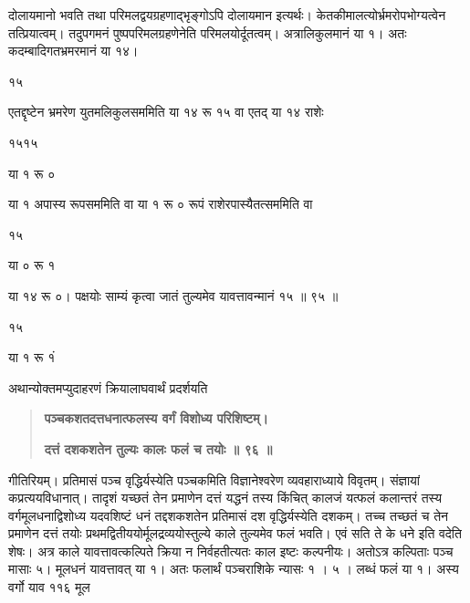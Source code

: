 \documentclass[11pt, openany]{book}
\begin{document}
\begin{sloppypar}
\hangindent=0.2in दोलायमानो भवति तथा परिमलद्वयग्रहणाद्भृङ्गोऽपि दोलायमान इत्यर्थः। केतकीमालत्योर्भ्रमरोपभोग्यत्वेन तत्प्रियात्वम्। तदुपगमनं पुष्पपरिमलग्रहणेनेति परिमलयोर्दूतत्वम्। अत्रालिकुलमानं या १। अतः कदम्बादिगतभ्रमरमानं या १४।

\hspace{2.15in}१५

\hangindent=0.2in एतद्दृष्टेन भ्रमरेण युतमलिकुलसममिति या १४ रू १५ वा एतद् या १४ राशेः

\hspace{2.55in}१५\hspace{1.3in}१५

\hspace{2.35in}या\hspace{0.1in} १ रू ०

\hangindent=0.2in या १ अपास्य रूपसममिति वा या १ रू ० रूपं राशेरपास्यैतत्सममिति वा

\hspace{2.25in}१५

\hspace{2in}या ० रू १

\hangindent=0.2in या १४ रू ०। पक्षयोः साम्यं कृत्वा जातं तुल्यमेव यावत्तावन्मानं १५ ॥ ९५ ॥

\hspace{0.2in}१५

या १ रू १ं

\hangindent=0.2in \hspace{0.2in}अथान्योक्तमप्युदाहरणं क्रियालाघवार्थं प्रदर्शयति\textendash

\begin{quote}
\hspace{1in}\textbf{पञ्चकशतदत्तधनात्फलस्य वर्गं विशोध्य परिशिष्टम्।}

\hspace{1in}\textbf{दत्तं दशकशतेन तुल्यः कालः फलं च तयोः ॥ ९६ ॥}
\end{quote}

\hangindent=0.2in \hspace{0.2in}गीतिरियम्। प्रतिमासं पञ्च वृद्धिर्यस्येति पञ्चकमिति विज्ञानेश्वरेण व्यवहाराध्याये विवृतम्। संज्ञायां कप्रत्ययविधानात्। तादृशं यच्छतं तेन प्रमाणेन दत्तं यद्धनं तस्य किंचित् कालजं यत्फलं कलान्तरं तस्य वर्गमूलधनाद्विशोध्य यदवशिष्टं धनं तद्दशकशतेन प्रतिमासं दश वृद्धिर्यस्येति दशकम्। तच्च तच्छतं च तेन प्रमाणेन दत्तं तयोः प्रथमद्वितीययोर्मूलद्रव्ययोस्तुल्ये काले तुल्यमेव फलं भवति। एवं सति ते के धने इति वदेति शेषः। अत्र काले यावत्तावत्कल्पिते क्रिया न निर्वहतीत्यतः काल इष्टः कल्पनीयः। अतोऽत्र कल्पिताः पञ्च मासाः ५। मूलधनं यावत्तावत् या १। अतः फलार्थं पञ्चराशिके न्यासः १ । ५ । लब्धं फलं या १। अस्य वर्गो याव ११६ मूल 


\end{sloppypar}
\end{document}
